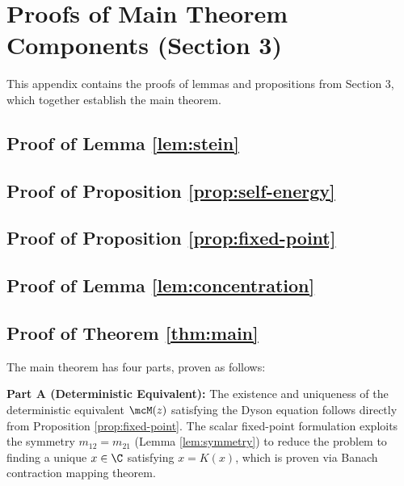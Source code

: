 
\section{Proofs of Main Theorem Components (Section 3)}

This appendix contains the proofs of lemmas and propositions from Section 3, which together establish the main theorem.

\subsection{Proof of Lemma \ref{lem:stein}}


\subsection{Proof of Proposition \ref{prop:self-energy}}


\subsection{Proof of Proposition \ref{prop:fixed-point}}


\subsection{Proof of Lemma \ref{lem:concentration}}


\subsection{Proof of Theorem \ref{thm:main}}

The main theorem has four parts, proven as follows:

\textbf{Part A (Deterministic Equivalent):} The existence and uniqueness of the deterministic equivalent $\mcM(z)$ satisfying the Dyson equation follows directly from Proposition \ref{prop:fixed-point}. The scalar fixed-point formulation exploits the symmetry $m_{12} = m_{21}$ (Lemma \ref{lem:symmetry}) to reduce the problem to finding a unique $x \in \C$ satisfying $x = K(x)$, which is proven via Banach contraction mapping theorem.

